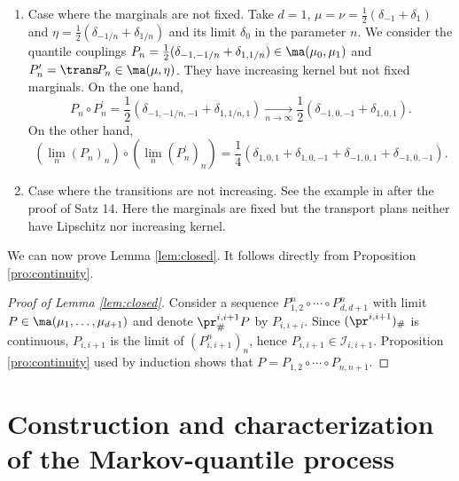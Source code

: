 \skpt
\begin{rem}
\begin{enumerate}
\item
Case where the mar\-gin\-als are not fixed. Take $d=1$, $\mu=\nu=\frac{1}{2}(\delta_{-1}+\delta_1)$ and $\eta=\frac{1}{2}(\delta_{-1/n}+\delta_{1/n})$ and its limit $\delta_0$ in the parameter $n$. We consider the quantile couplings $P_n=\frac{1}{2}(\delta_{-1,-1/n}+\delta_{1,1/n})\in\ma(\mu_0,\mu_1)$ and $P^{\prime}_n=\trans\!P_n\in\ma(\mu,\eta)$. They have increasing kernel but not fixed marginals. On the one hand,
\[
P_n\circ P^{\prime}_n=\frac{1}{2}(\delta_{-1,-1/n,-1}+\delta_{1,1/n,1})\underset{n\to\infty}{\longrightarrow}\frac{1}{2}(\delta_{-1,0,-1}+\delta_{1,0,1}).
\]
On the other hand,
\[
(\lim_n(P_n)_{n})\circ(\lim_n(P^{\prime}_n)_{n})=\frac{1}{4}(\delta_{1,0,1}+\delta_{1,0,-1}+\delta_{-1,0,1}+\delta_{-1,0,-1}).
\]

\item
Case where the transitions are not increasing. See the example in \cite{Ke72} after the proof of Satz 14. Here the marginals are fixed but the transport plans neither have Lipschitz nor increasing kernel.
\end{enumerate}
\end{rem}

We can now prove Lemma \ref{lem:closed}. It follows directly from Proposition \ref{pro:continuity}.

\begin{proof}[Proof of Lemma \ref{lem:closed}]\label{proof:lem:closed}
Consider a sequence $P^n_{1,2}\circ\cdots\circ P^n_{d,d+1}$ with limit $P\in\ma(\mu_1,\ldots,\mu_{d+1})$ and denote $\pr^{i,i+1}_{\#}P$ by $P_{i,i+i}$. Since $(\pr^{i,i+1})_\#$ is continuous, $P_{i,i+1}$ is the limit of $(P_{i,i+1}^n)_n$, hence $P_{i,i+1}\in\mathcal{I}_{i,i+1}$. Proposition \ref{pro:continuity} used by induction shows that $P=P_{1,2}\circ\cdots\circ P_{n,n+1}$.
\end{proof}

\section{Construction and characterization of the Markov-quantile process}\label{sec:construction}

